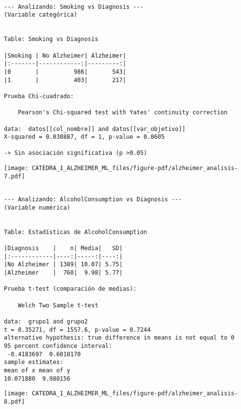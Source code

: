 \documentclass[
  letterpaper,
  DIV=11,
  numbers=noendperiod]{scrartcl}
\begin{document}
\begin{verbatim}

--- Analizando: Smoking vs Diagnosis ---
(Variable categórica)


Table: Smoking vs Diagnosis

|Smoking | No Alzheimer| Alzheimer|
|:-------|------------:|---------:|
|0       |          986|       543|
|1       |          403|       217|

Prueba Chi-cuadrado:

    Pearson's Chi-squared test with Yates' continuity correction

data:  datos[[col_nombre]] and datos[[var_objetivo]]
X-squared = 0.030887, df = 1, p-value = 0.8605

-> Sin asociación significativa (p >0.05)
\end{verbatim}

\begin{center}
\texttt{[image: CATEDRA\_1\_ALZHEIMER\_ML\_files/figure-pdf/alzheimer\_analisis-7.pdf]}
\end{center}

\begin{verbatim}

--- Analizando: AlcoholConsumption vs Diagnosis ---
(Variable numérica)


Table: Estadísticas de AlcoholConsumption

|Diagnosis    |    n| Media|   SD|
|:------------|----:|-----:|----:|
|No Alzheimer | 1389| 10.07| 5.75|
|Alzheimer    |  760|  9.98| 5.77|

Prueba t-test (comparación de medias):

    Welch Two Sample t-test

data:  grupo1 and grupo2
t = 0.35271, df = 1557.6, p-value = 0.7244
alternative hypothesis: true difference in means is not equal to 0
95 percent confidence interval:
 -0.4183697  0.6018170
sample estimates:
mean of x mean of y 
10.071880  9.980156 
\end{verbatim}

\begin{center}
\texttt{[image: CATEDRA\_1\_ALZHEIMER\_ML\_files/figure-pdf/alzheimer\_analisis-8.pdf]}
\end{center}
\end{document}
